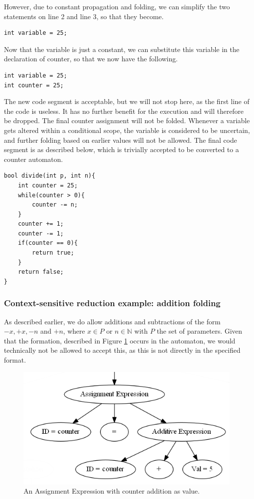 \documentclass[12pt]{article}
\begin{document}
However, due to constant propagation and folding, we can simplify the two statements on line 2 and line 3, so that they become.

\begin{lstlisting}[style=CStyle]
int variable = 25;
\end{lstlisting}

Now that the variable is just a constant, we can substitute this variable in the declaration of counter, so that we now have the following.
\begin{lstlisting}[style=CStyle]
int variable = 25;
int counter = 25;
\end{lstlisting}

The new code segment is acceptable, but we will not stop here, as the first line of the code is useless. It has no further benefit for the execution and will therefore be dropped. The final counter assignment will not be folded. Whenever a variable gets altered within a conditional scope, the variable is considered to be uncertain, and further folding based on earlier values will not be allowed. The final code segment is as described below, which is trivially accepted to be converted to a counter automaton.

\begin{lstlisting}[style=CStyle]
bool divide(int p, int n){
	int counter = 25;
	while(counter > 0){
		counter -= n;
	}
	counter += 1;
	counter -= 1;
	if(counter == 0){
		return true;
	}
	return false;
}
\end{lstlisting}

\subsubsection{Context-sensitive reduction example: addition folding}
As described earlier, we do allow additions and subtractions of the form $-x, +x, -n$ and $+n$, where $x \in P$ or $n \in \mathbb{N}$ with $P$ the set of parameters. Given that the formation, described in Figure \ref{fig:unfolded_addition} occurs in the automaton, we would technically not be allowed to accept this, as this is not directly in the specified format.

\begin{figure}[h]
	\centering
	\includegraphics[width=0.8\linewidth]{unfolded_addition}
	\caption{An Assignment Expression with counter addition as value.}
	\label{fig:unfolded_addition}
\end{figure}
\end{document}
